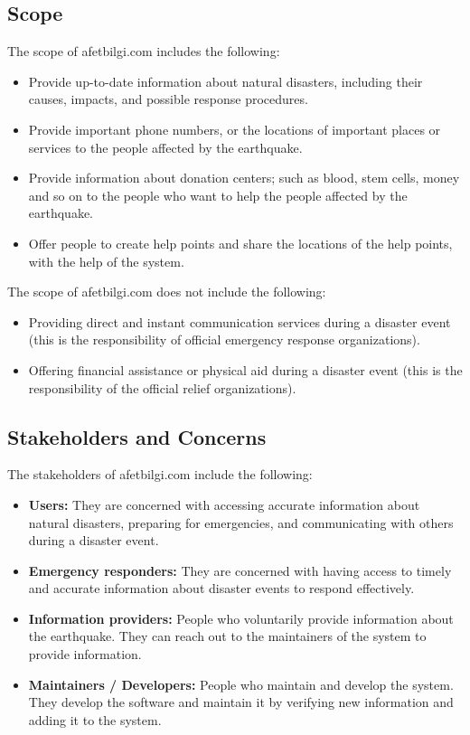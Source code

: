 \documentclass[a4paper]{article}
\begin{document}
    \subsection{Scope}
    The scope of afetbilgi.com includes the following:
    \begin{itemize}
        \item Provide up-to-date information about natural disasters, including their causes, impacts, and possible response
        procedures.
        \item Provide important phone numbers, or the locations of important places or services to the people affected by the
        earthquake.
        \item Provide information about donation centers; such as blood, stem cells, money and so on to the people who want to
        help the people affected by the earthquake.
        \item Offer people to create help points and share the locations of the help points, with the help of the system.
    \end{itemize}

    The scope of afetbilgi.com does not include the following:
    \begin{itemize}
        \item Providing direct and instant communication services during a disaster event (this is the responsibility of
        official emergency response organizations).
        \item Offering financial assistance or physical aid during a disaster event (this is the responsibility of the official
        relief organizations).
    \end{itemize}
    \subsection{Stakeholders and Concerns}
    The stakeholders of afetbilgi.com include the following:
    \begin{itemize}
        \item \textbf{Users:} They are concerned with accessing accurate information about natural disasters, preparing for
        emergencies, and communicating with others during a disaster event.
        \item \textbf{Emergency responders:} They are concerned with having access to timely and accurate information about
        disaster events to respond effectively.
        \item \textbf{Information providers:} People who voluntarily provide information about the earthquake. They can reach out
        to the maintainers of the system to provide information.
        \item \textbf{Maintainers / Developers:} People who maintain and develop the system. They develop the software and maintain
        it by verifying new information and adding it to the system.
    \end{itemize}
\end{document}
